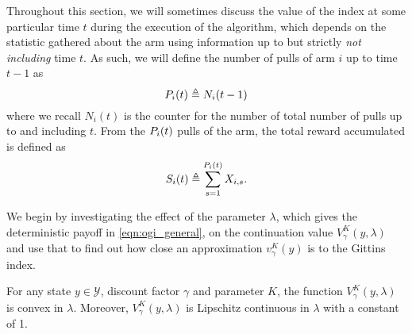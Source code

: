 Throughout this section, we will sometimes discuss the value of the index at some particular time $t$ during the execution of the algorithm, which depends on the statistic gathered about the arm using information up to but strictly \emph{not including} time $t$. As such, we will define the number of pulls of arm $i$ up to time $t-1$ as
\[
P_{i}(t) \triangleq N_i(t-1)
\]
where we recall $N_i(t)$ is the counter for the number of total number of pulls up to and including $t$. From the $P_{i}(t)$ pulls of the arm, the total reward accumulated is defined as
\[
S_i(t) \triangleq \sum_{s=1}^{P_{i}(t)} X_{i,s}.
\]

We begin by investigating the effect of the parameter $\lambda$, which gives the deterministic payoff in \eqref{eqn:ogi_general}, on the continuation value $V^K_\gamma(y, \lambda)$ and use that to find out how close an approximation $v^K_\gamma(y)$ is to the Gittins index.
\begin{fact}\label{fact:v_is_convex}
	For any state $y \in \mathcal{Y}$, discount factor $\gamma$ and parameter $K$, the function $V^K_\gamma(y,\lambda)$ is convex in $\lambda$.
	{\color{blue}Moreover, $V^K_\gamma(y,\lambda)$ is Lipschitz continuous in $\lambda$ with a constant of 1.}
\end{fact}
